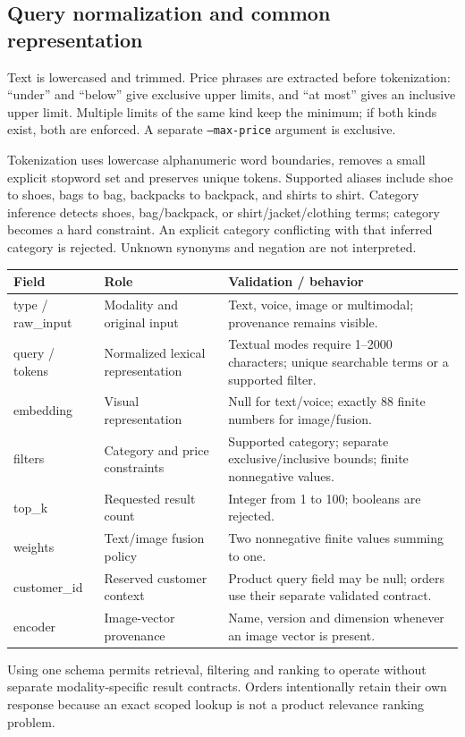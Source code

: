 \documentclass[11pt,a4paper]{article}
\begin{document}
\subsection{Query normalization and common representation}
Text is lowercased and trimmed. Price phrases are extracted before tokenization: ``under'' and ``below'' give exclusive upper limits, and ``at most'' gives an inclusive upper limit. Multiple limits of the same kind keep the minimum; if both kinds exist, both are enforced. A separate \texttt{--max-price} argument is exclusive.

Tokenization uses lowercase alphanumeric word boundaries, removes a small explicit stopword set and preserves unique tokens. Supported aliases include shoe to shoes, bags to bag, backpacks to backpack, and shirts to shirt. Category inference detects shoes, bag/backpack, or shirt/jacket/clothing terms; category becomes a hard constraint. An explicit category conflicting with that inferred category is rejected. Unknown synonyms and negation are not interpreted.

\begin{longtable}{@{}P{3.2cm}P{5.1cm}P{7.1cm}@{}}
\toprule\textbf{Field}&\textbf{Role}&\textbf{Validation / behavior}\\\midrule\endhead
type / raw\_input&Modality and original input&Text, voice, image or multimodal; provenance remains visible.\\
query / tokens&Normalized lexical representation&Textual modes require 1--2000 characters; unique searchable terms or a supported filter.\\
embedding&Visual representation&Null for text/voice; exactly 88 finite numbers for image/fusion.\\
filters&Category and price constraints&Supported category; separate exclusive/inclusive bounds; finite nonnegative values.\\
top\_k&Requested result count&Integer from 1 to 100; booleans are rejected.\\
weights&Text/image fusion policy&Two nonnegative finite values summing to one.\\
customer\_id&Reserved customer context&Product query field may be null; orders use their separate validated contract.\\
encoder&Image-vector provenance&Name, version and dimension whenever an image vector is present.\\\bottomrule
\end{longtable}
Using one schema permits retrieval, filtering and ranking to operate without separate modality-specific result contracts. Orders intentionally retain their own response because an exact scoped lookup is not a product relevance ranking problem.


\end{document}
